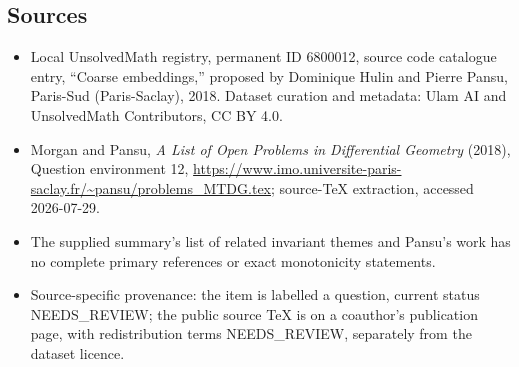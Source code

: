 \documentclass[11pt]{article}
\begin{document}
\subsection{Sources}
\begin{itemize}
\item Local UnsolvedMath registry, permanent ID 6800012, source code catalogue entry, ``Coarse embeddings,'' proposed by Dominique Hulin and Pierre Pansu, Paris-Sud (Paris-Saclay), 2018. Dataset curation and metadata: Ulam AI and UnsolvedMath Contributors, CC BY 4.0.
\item Morgan and Pansu, \emph{A List of Open Problems in Differential Geometry} (2018), Question environment 12, \url{https://www.imo.universite-paris-saclay.fr/~pansu/problems_MTDG.tex}; source-TeX extraction, accessed 2026-07-29.
\item The supplied summary's list of related invariant themes and Pansu's work has no complete primary references or exact monotonicity statements.
\item Source-specific provenance: the item is labelled a question, current status NEEDS\_REVIEW; the public source TeX is on a coauthor's publication page, with redistribution terms NEEDS\_REVIEW, separately from the dataset licence.
\end{itemize}
\end{document}
